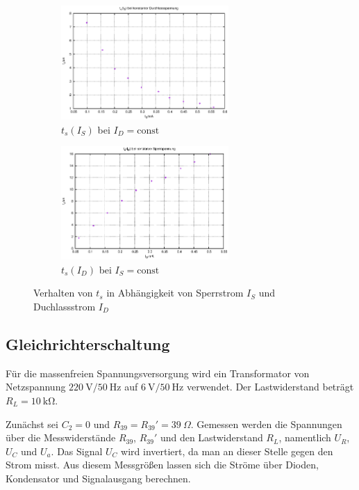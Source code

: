 \documentclass[10pt,a4paper]{scrartcl}
\begin{document}
\begin{figure}[!ht]
    \begin{subfigure}{\textwidth}
        \centering
        \includegraphics[width=0.7\textwidth]{graphics/diode_I_t_durchlass.eps}
        \caption{$t_s(I_S)$ bei $I_D=\text{const}$}
    \end{subfigure}
    \begin{subfigure}{\textwidth}
        \centering
        \includegraphics[width=0.7\textwidth]{graphics/diode_I_t_sperr.eps}
        \caption{$t_s(I_D)$ bei $I_S=\text{const}$}
    \end{subfigure}
    \caption{Verhalten von $t_s$ in Abhängigkeit von Sperrstrom $I_S$ und
    Duchlassstrom $I_D$}
    \label{fig:HL_t_s}
\end{figure}

\subsection {Gleichrichterschaltung}

Für die massenfreien Spannungsversorgung wird ein Transformator von Netzspannung
$220~\mathrm V/50~\mathrm{Hz}$ auf $6~\mathrm V/50~\mathrm{Hz}$ verwendet.
Der Lastwiderstand beträgt $R_L=10~\mathrm{k\Omega}$.

Zunächst sei $C_2=0$ und $R_{39}=R_{39}'=39~\Omega$.
Gemessen werden die Spannungen über die Messwiderstände $R_{39}$, $R_{39}'$
und den Lastwiderstand $R_L$,
namentlich $U_R$, $U_C$ und $U_a$.
Das Signal $U_C$ wird invertiert, da man an dieser Stelle gegen den Strom misst.
Aus diesem Messgrößen lassen sich die Ströme über Dioden, Kondensator und
Signalausgang berechnen.
\end{document}
